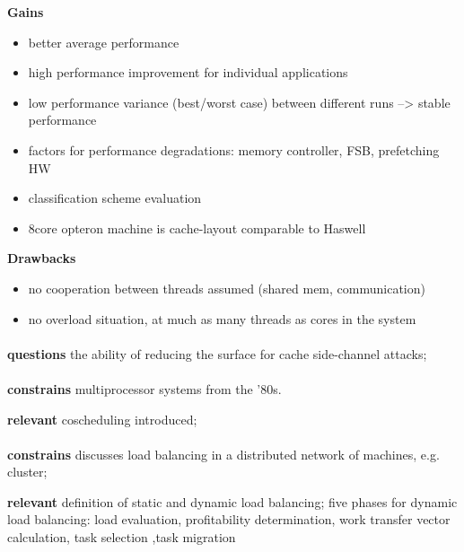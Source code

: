 \textbf{Gains}
\begin{itemize}
  \item better average performance
  \item high performance improvement for individual applications
  \item low performance variance (best/worst case) between different runs -->
    stable performance
  \item factors for performance degradations: memory controller, FSB,
    prefetching HW
  \item classification scheme evaluation
  \item 8core opteron machine is cache-layout comparable to Haswell
\end{itemize}

\textbf{Drawbacks}
\begin{itemize}
  \item no cooperation between threads assumed (shared mem, communication)
  \item no overload situation, at much as many threads as cores in the system
\end{itemize}


\paragraph{ \cite{liu_last-level_2015} }
\textbf{questions} the ability of reducing the surface for cache
side-channel attacks;


\paragraph{ \cite{ousterhout_scheduling_1982} }
\textbf{constrains} multiprocessor systems from the '80s.

\textbf{relevant} coscheduling introduced;

\paragraph{ \cite{watts_practical_1998} }
\textbf{constrains} discusses load balancing in a distributed network of
machines, e.g. cluster;

\textbf{relevant} definition of static and dynamic load balancing;
five phases for dynamic load balancing: load evaluation, profitability
determination, work transfer vector calculation, task selection ,task migration


